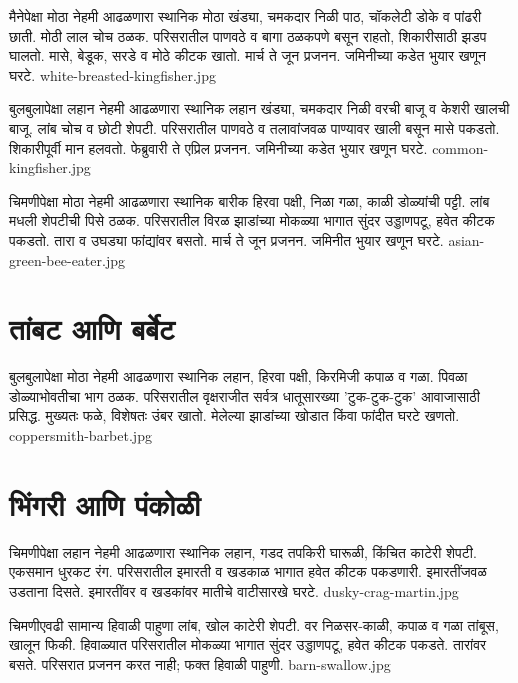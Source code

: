 \documentclass[aspectratio=169]{beamer}
\begin{document}
{मैनेपेक्षा मोठा}
{नेहमी आढळणारा स्थानिक}
{मोठा खंड्या, चमकदार निळी पाठ, चॉकलेटी डोके व पांढरी छाती. मोठी लाल चोच ठळक.}
{परिसरातील पाणवठे व बागा}
{ठळकपणे बसून राहतो, शिकारीसाठी झडप घालतो. मासे, बेडूक, सरडे व मोठे कीटक खातो.}
{मार्च ते जून प्रजनन. जमिनीच्या कडेत भुयार खणून घरटे.}
{white-breasted-kingfisher.jpg}

{बुलबुलापेक्षा लहान}
{नेहमी आढळणारा स्थानिक}
{लहान खंड्या, चमकदार निळी वरची बाजू व केशरी खालची बाजू. लांब चोच व छोटी शेपटी.}
{परिसरातील पाणवठे व तलावांजवळ}
{पाण्यावर खाली बसून मासे पकडतो. शिकारीपूर्वी मान हलवतो.}
{फेब्रुवारी ते एप्रिल प्रजनन. जमिनीच्या कडेत भुयार खणून घरटे.}
{common-kingfisher.jpg}

{चिमणीपेक्षा मोठा}
{नेहमी आढळणारा स्थानिक}
{बारीक हिरवा पक्षी, निळा गळा, काळी डोळ्यांची पट्टी. लांब मधली शेपटीची पिसे ठळक.}
{परिसरातील विरळ झाडांच्या मोकळ्या भागात}
{सुंदर उड्डाणपटू, हवेत कीटक पकडतो. तारा व उघड्या फांद्यांवर बसतो.}
{मार्च ते जून प्रजनन. जमिनीत भुयार खणून घरटे.}
{asian-green-bee-eater.jpg}

\section{तांबट आणि बर्बेट}
{बुलबुलापेक्षा मोठा}
{नेहमी आढळणारा स्थानिक}
{लहान, हिरवा पक्षी, किरमिजी कपाळ व गळा. पिवळा डोळ्याभोवतीचा भाग ठळक.}
{परिसरातील वृक्षराजीत सर्वत्र}
{धातूसारख्या 'टुक-टुक-टुक' आवाजासाठी प्रसिद्ध. मुख्यतः फळे, विशेषतः उंबर खातो.}
{मेलेल्या झाडांच्या खोडात किंवा फांदीत घरटे खणतो.}
{coppersmith-barbet.jpg}

\section{भिंगरी आणि पंकोळी}
{चिमणीपेक्षा लहान}
{नेहमी आढळणारा स्थानिक}
{लहान, गडद तपकिरी घारूळी, किंचित काटेरी शेपटी. एकसमान धुरकट रंग.}
{परिसरातील इमारती व खडकाळ भागात}
{हवेत कीटक पकडणारी. इमारतींजवळ उडताना दिसते.}
{इमारतींवर व खडकांवर मातीचे वाटीसारखे घरटे.}
{dusky-crag-martin.jpg}

{चिमणीएवढी}
{सामान्य हिवाळी पाहुणा}
{लांब, खोल काटेरी शेपटी. वर निळसर-काळी, कपाळ व गळा तांबूस, खालून फिकी.}
{हिवाळ्यात परिसरातील मोकळ्या भागात}
{सुंदर उड्डाणपटू, हवेत कीटक पकडते. तारांवर बसते.}
{परिसरात प्रजनन करत नाही; फक्त हिवाळी पाहुणी.}
{barn-swallow.jpg}
\end{document}
